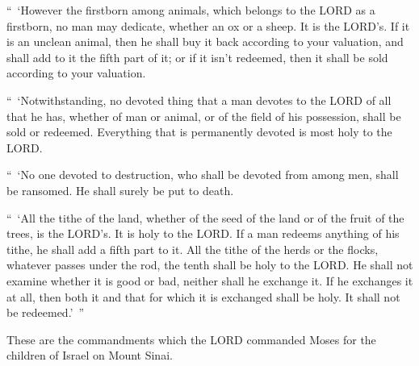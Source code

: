 \myverse{}“ ‘However the firstborn among animals, which belongs to the
LORD as a firstborn, no man may dedicate, whether an ox or a sheep. It is the LORD’s.
\myverse{}If it is an unclean animal, then he shall buy it back according to your valuation,
and shall add to it the fifth part of it; or if it isn’t redeemed, then it shall be sold according to
your valuation.


\myverse{}“ ‘Notwithstanding, no devoted thing that a man devotes to the
LORD of all that he has, whether of man or animal, or of the field of his possession, shall be sold or
redeemed. Everything that is permanently devoted is most holy to the LORD.


\myverse{}“ ‘No one devoted to destruction, who shall be devoted from among
men, shall be ransomed. He shall surely be put to death.


\myverse{}“ ‘All the tithe of the land, whether of the seed of the land
or of the fruit of the trees, is the LORD’s. It is holy to the LORD.
\myverse{}If a man redeems anything of his tithe, he shall add a fifth part to it.
\myverse{}All the tithe of the herds or the flocks, whatever passes under the rod,
the tenth shall be holy to the LORD.
\myverse{}He shall not examine whether it is good or bad, neither shall he exchange
it. If he exchanges it at all, then both it and that for which it is exchanged shall be holy. It shall
not be redeemed.’ ”


\myverse{}These are the commandments which the LORD commanded Moses for
the children of Israel on Mount Sinai.


